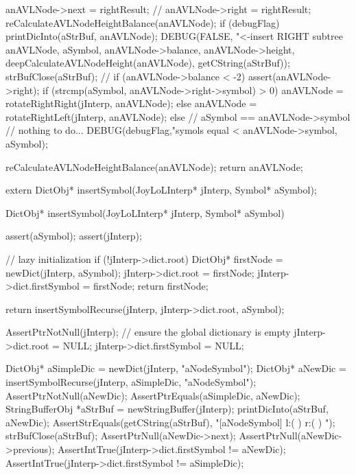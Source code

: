 {{{      anAVLNode->next                = rightResult;
      //
    }
    anAVLNode->right = rightResult;
    reCalculateAVLNodeHeightBalance(anAVLNode);
    if (debugFlag) {
      printDicInto(aStrBuf, anAVLNode);
      DEBUG(FALSE, "<-insert RIGHT subtree %
          anAVLNode, aSymbol, anAVLNode->balance,
          anAVLNode->height, deepCalculateAVLNodeHeight(anAVLNode),
          getCString(aStrBuf));
      strBufClose(aStrBuf);
    }
    //
    if (anAVLNode->balance < -2) {
      assert(anAVLNode->right);
      if (strcmp(aSymbol, anAVLNode->right->symbol) > 0) {
        anAVLNode = rotateRightRight(jInterp, anAVLNode);
      } else {
        anAVLNode = rotateRightLeft(jInterp, anAVLNode);
      }
    }
  } else {
    // aSymbol == anAVLNode->symbol // nothing to do...
    DEBUG(debugFlag,"symols equal <%
          anAVLNode->symbol, aSymbol);
  }

  reCalculateAVLNodeHeightBalance(anAVLNode);
  return anAVLNode;
}
\stopCCode

\startCHeader
extern DictObj* insertSymbol(JoyLoLInterp* jInterp, Symbol* aSymbol);
\stopCHeader

\startCCode
DictObj* insertSymbol(JoyLoLInterp* jInterp, Symbol* aSymbol) {
  assert(aSymbol);
  assert(jInterp);

  // lazy initialization
  if (!jInterp->dict.root) {
    DictObj* firstNode = newDict(jInterp, aSymbol);
    jInterp->dict.root        = firstNode;
    jInterp->dict.firstSymbol = firstNode;
    return firstNode;
  }

  return insertSymbolRecurse(jInterp, jInterp->dict.root, aSymbol);
}
\stopCCode

\startCTest
  AssertPtrNotNull(jInterp);
  // ensure the global dictionary is empty
  jInterp->dict.root        = NULL;
  jInterp->dict.firstSymbol = NULL;
  
  DictObj* aSimpleDic = newDict(jInterp, "aNodeSymbol");
  DictObj* aNewDic = insertSymbolRecurse(jInterp, aSimpleDic, "aNodeSymbol");
  AssertPtrNotNull(aNewDic);
  AssertPtrEquals(aSimpleDic, aNewDic);
  StringBufferObj *aStrBuf = newStringBuffer(jInterp);
  printDicInto(aStrBuf, aNewDic);
  AssertStrEquals(getCString(aStrBuf),
  "[aNodeSymbol] l:(  ) r:(  ) ");
  strBufClose(aStrBuf);
  AssertPtrNull(aNewDic->next);
  AssertPtrNull(aNewDic->previous);
  AssertIntTrue(jInterp->dict.firstSymbol != aNewDic);
  AssertIntTrue(jInterp->dict.firstSymbol != aSimpleDic);
\stopCTest
\stopTestCase

